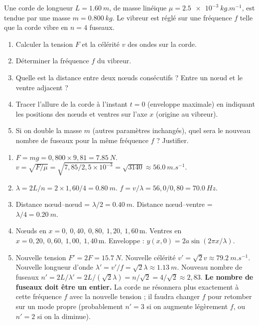 \documentclass[11pt]{article}
\begin{document}
\begin{exercice}
Une corde de longueur $L=\SI{1,60}{m}$, de masse linéique $\mu=\SI{2,5e-3}{kg.m^{-1}}$, est tendue par une masse $m=\SI{0,800}{kg}$. Le vibreur est réglé sur une fréquence $f$ telle que la corde vibre en $n=4$ fuseaux.
\begin{enumerate}
\item Calculer la tension $F$ et la célérité $v$ des ondes sur la corde.
\item Déterminer la fréquence $f$ du vibreur.
\item Quelle est la distance entre deux nœuds consécutifs ? Entre un nœud et le ventre adjacent ?
\item Tracer l'allure de la corde à l'instant $t=0$ (enveloppe maximale) en indiquant les positions des nœuds et ventres sur l'axe $x$ (origine au vibreur).
\item Si on double la masse $m$ (autres paramètres inchangés), quel sera le nouveau nombre de fuseaux pour la même fréquence $f$ ? Justifier.
\end{enumerate}
\end{exercice}


\begin{corrige}
\begin{enumerate}
\item $F = mg = 0,800\times9,81 = \SI{7,85}{N}$. $v = \sqrt{F/\mu} = \sqrt{7,85 / 2,5\times10^{-3}} = \sqrt{3140} \approx \SI{56,0}{m.s^{-1}}$.
\item $\lambda = 2L/n = 2\times1,60/4 = \SI{0,80}{m}$. $f = v/\lambda = 56,0/0,80 = \SI{70,0}{Hz}$.
\item Distance nœud--nœud = $\lambda/2 = \SI{0,40}{m}$. Distance nœud--ventre = $\lambda/4 = \SI{0,20}{m}$.
\item Nœuds en $x = 0,\ 0,40,\ 0,80,\ 1,20,\ 1,60\,\text{m}$. Ventres en $x = 0,20,\ 0,60,\ 1,00,\ 1,40\,\text{m}$. Enveloppe : $y(x,0) = 2a\sin(2\pi x/\lambda)$.
\item Nouvelle tension $F' = 2F = \SI{15,7}{N}$. Nouvelle célérité $v' = \sqrt{2}v \approx \SI{79,2}{m.s^{-1}}$. Nouvelle longueur d'onde $\lambda' = v'/f = \sqrt{2}\lambda \approx \SI{1,13}{m}$. Nouveau nombre de fuseaux $n' = 2L/\lambda' = 2L/(\sqrt{2}\lambda) = n/\sqrt{2} = 4/\sqrt{2} \approx 2,83$. \textbf{Le nombre de fuseaux doit être un entier.} La corde ne résonnera plus exactement à cette fréquence $f$ avec la nouvelle tension ; il faudra changer $f$ pour retomber sur un mode propre (probablement $n'=3$ si on augmente légèrement $f$, ou $n'=2$ si on la diminue).
\end{enumerate}
\end{corrige}
\end{document}
